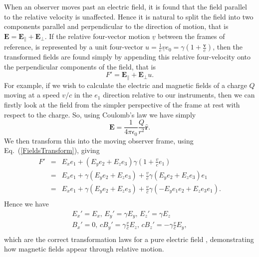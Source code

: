 \documentclass[12pt,aps,prb,preprint]{revtex4}   %
\newcommand{\be}{\begin{equation}}
\newcommand{\ee}{\end{equation}}
\newcommand{\bea}{\begin{eqnarray}}
\newcommand{\eea}{\end{eqnarray}}
\begin{document}
When an observer moves past an electric field, it is found that the field parallel to the relative velocity is unaffected. Hence it is natural to split the field into two components parallel and perpendicular to the direction of motion, that is $ \mathbf{E} = \mathbf{E}_{\|} + \mathbf{E}_{\perp} $.  If the relative four-vector motion $ \underline{v} $ between the frames of reference, is represented by a unit four-vector $ u = \frac{1}{c} \underline{v} e_0= \gamma ( 1 + \frac{\mathbf{v}}{c} ) $, then the transformed fields are found simply by appending this relative four-velocity onto the perpendicular components of the field, that is
\be \label{FieldsTransform}
F' = \mathbf{E}_{\|} + \mathbf{E}_{\perp} u .
\ee
For example, if we wish to calculate the electric and magnetic fields of a charge $ Q $ moving at a speed $ v/c $ in the $ e_1 $ direction relative to our instruments, then we can firstly look at the field from the simpler perspective of the frame at rest with respect to the charge. So, using Coulomb's law we have simply
\be
\mathbf{E} = \frac{1}{4 \pi \epsilon_0} \frac{Q}{r^2} \mathbf{\hat{r}} .
\ee
We then transform this into the moving observer frame, using Eq.~(\ref{FieldsTransform}), giving
\bea
F' & = & E_x e_1  + (E_y e_2 + E_z e_3 ) \gamma ( 1 + \frac{v}{c} e_1 ) \\ \nonumber
 & = & E_x e_1  + \gamma (E_y e_2 + E_z e_3 ) + \frac{v}{c} \gamma (E_y e_2 + E_z e_3 ) e_1   \\ \nonumber
 & = & E_x e_1  + \gamma (E_y e_2 + E_z e_3 ) + \frac{v}{c} \gamma (-E_y e_1 e_2 + E_z e_3 e_1 )    . \\ \nonumber
\eea
Hence we have
\bea
E_x'=E_x  , \, E_y'  = \gamma E_y , \, E_z' = \gamma E_z \\ \nonumber
B_x' = 0   , \, c B_y'  = \gamma \frac{v}{c} E_z , \, c B_z' = - \gamma \frac{v}{c} E_y , \\ \nonumber
\eea
which are the correct transformation laws for a pure electric field \cite{Griffiths:1999}, demonstrating how magnetic fields appear through relative motion.
\end{document}
